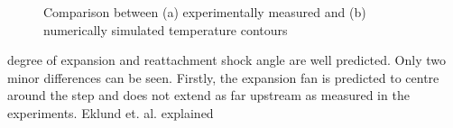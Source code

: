 %
\begin{figure}[h]
 \centering
 \caption{Comparison between (a) experimentally measured and (b)
          numerically simulated temperature contours}
 \label{figure-backward-step-temperature-contours}
\end{figure}
%
degree of expansion and reattachment shock angle are well predicted. Only 
two minor differences can be seen. Firstly, the expansion fan is predicted 
to centre around the step and does not extend as far upstream as measured 
in the experiments. Eklund et. al. \cite{Eklund1995} explained
